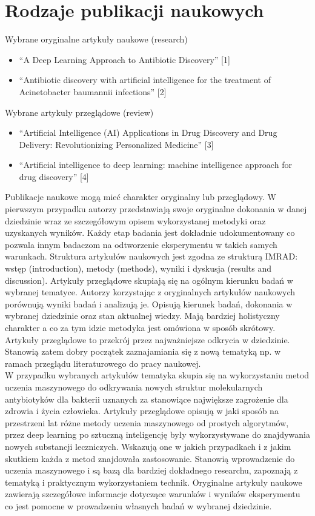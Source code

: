 \section{Rodzaje publikacji naukowych}
Wybrane oryginalne artykuły naukowe (research)
    \begin{itemize}
        \item “A Deep Learning Approach to Antibiotic Discovery” [1] 
        \item “Antibiotic discovery with artificial intelligence for the treatment of Acinetobacter baumannii infections” [2] 
    \end{itemize}
Wybrane artykuły przeglądowe (review)
    \begin{itemize}
        \item “Artificial Intelligence (AI) Applications in Drug Discovery and Drug Delivery: Revolutionizing Personalized Medicine” [3] 
        \item “Artificial intelligence to deep learning: machine intelligence approach for drug discovery”  [4] 
    \end{itemize}
Publikacje naukowe mogą mieć charakter oryginalny lub przeglądowy. W pierwszym przypadku autorzy przedstawiają swoje oryginalne dokonania w danej dziedzinie wraz ze szczegółowym opisem wykorzystanej metodyki oraz uzyskanych wyników. Każdy etap badania jest dokładnie udokumentowany co pozwala innym badaczom na odtworzenie eksperymentu w takich samych warunkach. Struktura artykułów naukowych jest zgodna ze strukturą IMRAD: wstęp (introduction), metody (methods), wyniki i dyskusja (results and discussion). Artykuły przeglądowe skupiają się na ogólnym kierunku badań w wybranej tematyce. Autorzy korzystając z oryginalnych artykułów naukowych porównują wyniki badań i analizują je. Opisują kierunek badań, dokonania w wybranej dziedzinie oraz stan aktualnej wiedzy. Mają bardziej holistyczny charakter a co za tym idzie metodyka jest omówiona w sposób skrótowy. Artykuły przeglądowe to przekrój przez najważniejsze odkrycia w dziedzinie. Stanowią zatem dobry początek zaznajamiania się z nową tematyką np. w ramach przeglądu literaturowego do pracy naukowej. \\

W przypadku wybranych artykułów tematyka skupia się na wykorzystaniu metod uczenia maszynowego do odkrywania nowych struktur molekularnych antybiotyków dla bakterii uznanych za stanowiące największe zagrożenie dla zdrowia i życia człowieka. Artykuły przeglądowe opisują w jaki sposób na przestrzeni lat różne metody uczenia maszynowego od prostych algorytmów, przez deep learning po sztuczną inteligencję były wykorzystywane do znajdywania nowych substancji leczniczych. Wskazują one w jakich przypadkach i z jakim skutkiem każda z metod znajdowała zastosowanie. Stanowią wprowadzenie do uczenia maszynowego i są bazą dla bardziej dokładnego researchu, zapoznają z tematyką i praktycznym wykorzystaniem technik. Oryginalne artykuły naukowe zawierają szczegółowe informacje dotyczące warunków i wyników eksperymentu co jest pomocne w prowadzeniu własnych badań w wybranej dziedzinie.
